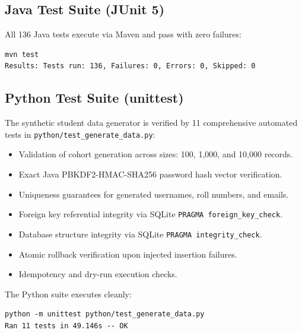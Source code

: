 \subsection{Java Test Suite (JUnit 5)}
All 136 Java tests execute via Maven and pass with zero failures:
\begin{verbatim}
mvn test
Results: Tests run: 136, Failures: 0, Errors: 0, Skipped: 0
\end{verbatim}

\subsection{Python Test Suite (unittest)}
The synthetic student data generator is verified by 11 comprehensive automated tests in \texttt{python/test\_generate\_data.py}:
\begin{itemize}
    \item Validation of cohort generation across sizes: 100, 1{,}000, and 10{,}000 records.
    \item Exact Java PBKDF2-HMAC-SHA256 password hash vector verification.
    \item Uniqueness guarantees for generated usernames, roll numbers, and emails.
    \item Foreign key referential integrity via SQLite \texttt{PRAGMA foreign\_key\_check}.
    \item Database structure integrity via SQLite \texttt{PRAGMA integrity\_check}.
    \item Atomic rollback verification upon injected insertion failures.
    \item Idempotency and dry-run execution checks.
\end{itemize}

The Python suite executes cleanly:
\begin{verbatim}
python -m unittest python/test_generate_data.py
Ran 11 tests in 49.146s -- OK
\end{verbatim}
